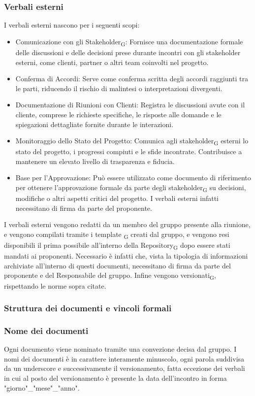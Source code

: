 \documentclass{article}
\begin{document}
\subsubsection{Verbali esterni}
I verbali esterni nascono per i seguenti scopi:
\begin{itemize}
    \item Comunicazione con gli Stakeholder\textsubscript{G}: Fornisce una documentazione formale delle discussioni e delle decisioni prese durante incontri con gli stakeholder esterni, come clienti, partner o altri team coinvolti nel progetto.
    \item Conferma di Accordi: Serve come conferma scritta degli accordi raggiunti tra le parti, riducendo il rischio di malintesi o interpretazioni divergenti.
    \item Documentazione di Riunioni con Clienti: Registra le discussioni avute con il cliente, comprese le richieste specifiche, le risposte alle domande e le spiegazioni dettagliate fornite durante le interazioni.
    \item Monitoraggio dello Stato del Progetto: Comunica agli stakeholder\textsubscript{G} esterni lo stato del progetto, i progressi compiuti e le sfide incontrate. Contribuisce a mantenere un elevato livello di trasparenza e fiducia.
    \item Base per l'Approvazione: Può essere utilizzato come documento di riferimento per ottenere l'approvazione formale da parte degli stakeholder\textsubscript{G} su decisioni, modifiche o altri aspetti critici del progetto. I verbali esterni infatti necessitano di firma da parte del proponente.
\end{itemize}

I verbali esterni vengono redatti da un membro del gruppo presente alla riunione, e vengono compilati tramite i template \textsubscript{G} creati dal gruppo, e vengono resi disponibili il prima possibile all'interno della Repository\textsubscript{G} dopo essere stati mandati ai proponenti. Necessario è infatti che, vista la tipologia di informazioni archiviate all'interno di questi documenti, necessitano di firma da parte del proponente e del Responsabile del gruppo. Infine vengono versionati\textsubscript{G}, rispettando le norme sopra citate.

\subsubsection{Struttura dei documenti e vincoli formali}
\subsubsection*{Nome dei documenti}
Ogni documento viene nominato tramite una convezione decisa dal gruppo. I nomi dei documenti è in carattere interamente minuscolo, ogni parola suddivisa da un underscore e successivamente il versionamento, fatta eccezione dei verbali in cui al posto del versionamento è presente la data dell'incontro in forma "giorno"\_"mese"\_"anno".
\end{document}
